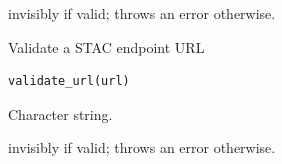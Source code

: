 \documentclass[a4paper]{book}
\begin{document}
%
\begin{Value}
 invisibly if valid; throws an error otherwise.
\end{Value}
%
\begin{Description}
Validate a STAC endpoint URL
\end{Description}
%
\begin{Usage}
\begin{verbatim}
validate_url(url)
\end{verbatim}
\end{Usage}
%
\begin{Arguments}
\begin{ldescription}
\item[\code{url}] Character string.
\end{ldescription}
\end{Arguments}
%
\begin{Value}
 invisibly if valid; throws an error otherwise.
\end{Value}
\printindex{}
\end{document}

